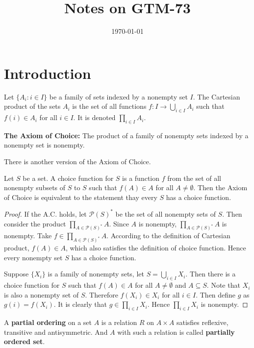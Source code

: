 \documentclass{article}
\title{Notes on GTM-73}
\date{\today}
\begin{document}
\maketitle
\newpage
\section{Introduction}
\begin{definition}
    Let $\{A_i: i \in I\}$ be a family of sets indexed by a nonempty set $I$. The Cartesian product of the sets $A_{i}$ is the set of all functions $f:I\rightarrow \bigcup_{i\in I}A_{i}$ such that $f(i)\in A_{i}$ for all $i\in I$. It is denoted $\prod_{i\in I} A_{i}$.
\end{definition}

\textbf{The Axiom of Choice:} 
The product of a family of nonempty sets indexed by a nonempty set is nonempty.

There is another version of the Axiom of Choice.
\begin{theorem}
    Let $S$ be a set. A choice function for $S$ is a function $f$ from the set of all nonempty subsets of $S$ to $S$ such that $f(A)\in A$ for all $A\neq \emptyset $. Then the Axiom of Choice is equivalent to the statement thay every $S$ has a choice function.
\end{theorem}

\begin{proof}
    If the A.C. holds, let $\mathcal{P}(S)^*$ be the set of all nonempty sets of $S$. Then consider the product $\prod_{A\in \mathcal{P}(S)^*}A$. Since $A$ is nonempty, $\prod_{A\in \mathcal{P}(S)^*}A$ is nonempty. Take $f\in \prod_{A\in \mathcal{P}(S)^*}A$. According to the definition of Cartesian product, $f(A)\in A$, which also satisfies the definition of choice function. Hence every nonempty set $S$ has a choice function.
    
    Suppose $\{X_i\}$ is a family of nonempty sets, let $S=\bigcup_{i\in I}X_i$. Then there is a choice function for $S$ such that $f(A)\in A$ for all $A\neq \emptyset$ and $A\subseteq S$. Note that $X_i$ is also a nonempty set of $S$. Therefore $f(X_i)\in X_i$ for all $i\in I$. Then define $g$ as $g(i)=f(X_i)$. It is clearly that $g\in \prod_{i\in I}X_i$. Hence $\prod_{i\in I}X_i$ is nonempty.
\end{proof}


\begin{definition}
    A \textbf{partial ordering} on a set $A$ is a relation $R$ on $A\times A$ satisfies reflexive, transitive and antisymmetric. And $A$ with such a relation is called \textbf{partially ordered set}.
\end{definition}
\end{document}
